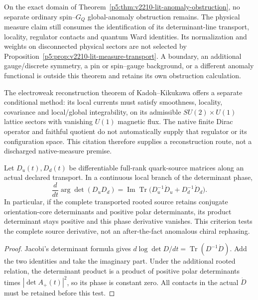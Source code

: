 \documentclass[12pt,a4paper]{article}
\begin{document}
\begin{corollary}
\label{p5:cor:v2210-lit-anomaly-remainder}
On the exact domain of
Theorem~\ref{p5:thm:v2210-lit-anomaly-obstruction}, no separate ordinary
spin--\(G_Q\) global-anomaly obstruction remains.  The physical measure
claim still consumes the identification of its determinant-line transport,
locality, regulator contacts and quantum Ward identities.  Its normalization
and weights on disconnected physical sectors are not selected by
Proposition~\ref{p5:prop:v2210-lit-measure-transport}.  A boundary, an
additional gauge/discrete symmetry, a pin or spin--gauge background, or a
different anomaly functional is outside this theorem and retains its own
obstruction calculation.
\end{corollary}
The electroweak reconstruction theorem of Kadoh--Kikukawa
\cite{LitSMChiralMeasure2008} offers a separate conditional method: its
local currents must satisfy smoothness, locality, covariance and local/global
integrability, on its admissible \(SU(2)\times U(1)\) lattice sectors with
vanishing \(U(1)\) magnetic flux.  The native finite Dirac operator and
faithful quotient do not automatically supply that regulator or its
configuration space.  This citation therefore supplies a reconstruction
route, not a discharged native-measure premise.

\begin{proposition}
\label{p5:prop:v2210-lit-strong-phase-jet}
Let \(D_u(t),D_d(t)\) be differentiable full-rank quark-source matrices
along an actual declared transport.  In a continuous local branch of the
determinant phase,
\[
 \boxed{\frac{d}{dt}\arg\det(D_uD_d)
 =\operatorname{Im}\operatorname{Tr}
 \bigl(D_u^{-1}\dot D_u+D_d^{-1}\dot D_d\bigr).}
\]
In particular, if the complete transported rooted source retains conjugate
orientation-core determinants and positive polar determinants, its product
determinant stays positive and this phase derivative vanishes.  This
criterion tests the complete source derivative, not an after-the-fact
anomalous chiral rephasing.
\end{proposition}
\begin{proof}
Jacobi's determinant formula gives
\(d\log\det D/dt=\operatorname{Tr}(D^{-1}\dot D)\).
Add the two identities and take the imaginary part.  Under the additional
rooted relation, the determinant product is a product of positive polar
determinants times \(|\det A_+(t)|^2\), so its phase is constant zero.
All contacts in the actual \(\dot D\) must be retained before this test.
\end{proof}
\end{document}
